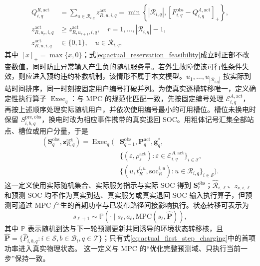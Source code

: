 \documentclass[12pt,a4paper,UTF8]{ctexart}
\begin{document}
\begin{subequations}
\label{eq:actual_random_service}
\begin{align}
Q_{i,q}^{R,\mathrm{act}}
&=\sum_{u\in\mathcal R_{i,q}}z_{R,u,i,q}^{\mathrm{act}}
=\min\!\left\{|\mathcal R_{i,q}|,
\left[F_{i,q}^{\mathrm{obs}}-Q_{i,q}^{A,\mathrm{act}}\right]_+\right\},
\label{eq:actual_random_service_count}\\
z_{R,u_r,i,q}^{\mathrm{act}}
&\ge z_{R,u_{r+1},i,q}^{\mathrm{act}},
\quad r=1,\ldots,|\mathcal R_{i,q}|-1,
\label{eq:actual_random_fcfs}\\
z_{R,u,i,q}^{\mathrm{act}}
&\in\{0,1\},
\quad u\in\mathcal R_{i,q},
\label{eq:actual_random_service_domain}
\end{align}
\end{subequations}
其中 $[x]_+=\max\{x,0\}$；式\eqref{eq:actual_reservation_feasibility}成立时正部不改变数值，同时防止异常输入产生负的随机服务量。若外生故障使该可行性条件失效，则应进入预约违约补救机制，该情形不属于本文模型。$u_1,\ldots,u_{|\mathcal R_{i,q}|}$ 按实际到站时间排序，同一时刻按固定用户编号打破并列。为使真实逐槽转移唯一，定义确定性执行算子 $\operatorname{Exec}_q$：与 MPC 的规范化匹配一致，先按固定编号处理 $\mathcal E_{i,q}^{A,\mathrm{act}}$，再按上述顺序处理实际随机用户，并依次使用编号最小的可用槽位。槽位未换电时保留 $S_{i,b,q}^{\mathrm{pre,obs}}$，换电时改为相应事件携带的真实退回 SOC。用粗体记号汇集全部站点、槽位或用户分量，于是
\begin{equation}
\begin{aligned}
(\mathbf S_{q}^{\mathrm{obs}},\mathbf z_{R,q}^{\mathrm{act}})
=\operatorname{Exec}_q\!\Big(&
\mathbf S_{q-1}^{\mathrm{obs}},\mathbf P_q^{\mathrm{act}},\mathbf g_q^*,\\
&\{(\varepsilon,\rho_\varepsilon^{\mathrm{act}}):
\varepsilon\in\mathcal E_{i,q}^{A,\mathrm{act}}\}_{i\in\mathcal S},
\\
&\{(u,t_R^{i,u},\mathrm{soc}_R^{i,u}):u\in\mathcal R_{i,q}\}_{i\in\mathcal S}
\Big).
\end{aligned}
\label{eq:actual_execution_operator}
\end{equation}
这一定义使用实际随机集合、实际服务指示与实际 SOC 得到 $\mathbf S_{\ell}^{\mathrm{obs}}$；$\widehat{\mathcal R}_{i,\ell}$、$z_{\nu,i,\ell}$ 和预测 SOC 均不作为真实到达、真实服务或真实退回 SOC 输入执行算子，但预测可通过 MPC 产生的首期功率与已发布路径间接影响执行。状态转移可表示为
\begin{equation}
s_{\ell+1}
\sim
\mathbb P\!\left(
\cdot\mid
s_\ell,a_\ell,
\mathrm{MPC}(s_\ell,\widehat{\mathbf P})
\right),
\label{eq:rl_transition}
\end{equation}
其中 $\mathbb P$ 表示随机到达与下一轮预测更新共同诱导的环境状态转移核，且
$\widehat{\mathbf P}=\{\widehat P_{i,b,q}:i\in\mathcal S,b\in\mathcal B_i,q\in\mathcal T\}$；只有式\eqref{eq:actual_first_step_charging}中的首项功率进入真实物理状态。
这一定义与 MPC 的“优化完整预测域、只执行当前一步”保持一致。
\end{document}

